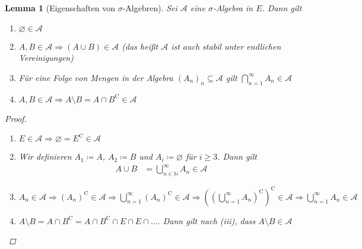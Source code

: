 \documentclass[11pt, twoside, a4paper]{article}
\theoremstyle{plain}
\newtheorem{lemma}[blockelement]{Lemma}
\numberwithin{equation}{subsection}
\newcommand{\pair}[1]{\left(#1\right)}
\newcommand{\impl}[0]{\Rightarrow{}}
\newcommand{\exclude}[0]{\setminus}
\renewcommand{\emptyset}{\varnothing}
\newcommand{\comp}[1]{{#1}^{\mathrm{C}}}
\newcommand{\theoremescape}{\leavevmode}
\newcommand{\N}{\mathbb{N}}
\begin{document}
    \begin{lemma}[Eigenschaften von $\sigma$-Algebren]
        Sei $\mathcal{A}$ eine $\sigma$-Algebra in $E$. Dann gilt
        \begin{enumerate}[label=(\roman*)]
            \item $\emptyset\in\mathcal{A}$
            \item $A, B\in\mathcal{A} \impl \pair{A\cup B} \in\mathcal{A}$ (das heißt $\mathcal{A}$ ist auch stabil unter endlichen Vereinigungen)
            \item Für eine Folge von Mengen in der Algebra $\pair{A_n}_n \subseteq \mathcal{A}$ gilt $\bigcap_{n=1}^{\infty} A_n \in\mathcal{A}$
            \item $A, B\in\mathcal{A} \impl A \exclude B = A \cap \comp{B} \in \mathcal{A}$
        \end{enumerate}

        \begin{proof}
            \theoremescape
            \begin{enumerate}[label=(\roman*)]
                \item $E\in\mathcal{A} \impl \emptyset = \comp{E} \in\mathcal{A}$
                \item Wir definieren $A_1 \coloneqq A$, $A_2 \coloneqq B$ und $A_i \coloneqq \emptyset$ für $i\geq 3$. Dann gilt
                \begin{align*}
                    A \cup B &= \bigcup_{n\in\N}^{\infty} A_n \in \mathcal{A}
                \end{align*}
                \item $A_n \in \mathcal{A} \impl \comp{\pair{A_n}} \in \mathcal{A} \impl \bigcup_{n=1}^{\infty} \comp{\pair{A_n}} \in \mathcal{A} \impl \comp{\pair{\comp{\pair{\bigcup_{n=1}^{\infty} A_n}}}} \in \mathcal{A} \impl \bigcup_{n=1}^{\infty} A_n\in\mathcal{A}$
                \item $A\exclude B = A \cap \comp{B} = A \cap \comp{B} \cap E \cap E \cap \dots$. Dann gilt nach (iii), dass $A \exclude B \in\mathcal{A}$
            \end{enumerate}
        \end{proof}
    \end{lemma}
\end{document}
